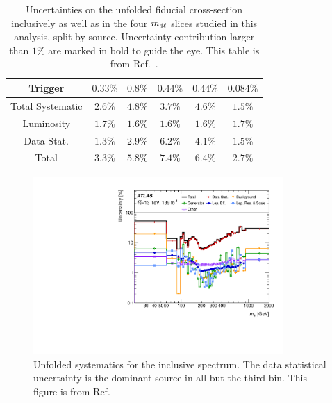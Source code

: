 \begin{table}
\begin{tabular} {c  c  c  c  c  c }
        Trigger &  $ 0.33\% $  &  $ 0.8\% $  &  $ 0.44\% $  &  $ 0.44\% $  &  $ 0.084\% $ \\
        \hline 
        Total Systematic &  $ 2.6\% $  &  $ 4.8\% $  &  $ 3.7\% $  &  $ 4.6\% $  &  $ 1.5\% $ \\
        Luminosity &  $ \mathbf{1.7}\% $  &  $ \mathbf{1.6}\% $  &  $ \mathbf{1.6}\% $  &  $ \mathbf{1.6}\% $  &  $ \mathbf{1.7}\% $ \\
        Data Stat. &  $ \mathbf{1.3}\% $  &  $ \mathbf{2.9}\% $  &  $ \mathbf{6.2}\% $  &  $ \mathbf{4.1}\% $  &  $ \mathbf{1.5}\% $ \\
        \hline 
        Total &  $ 3.3\% $  &  $ 5.8\% $  &  $ 7.4\% $  &  $ 6.4\% $  &  $ 2.7\% $ \\
        \hline 
     \end{tabular}
    \caption{Uncertainties on the unfolded fiducial cross-section inclusively as well as in the four $m_{4\ell}$ slices studied in this analysis, split by source. Uncertainty contribution larger than $1\%$ are marked in bold to guide the eye. This table is from Ref.~\cite{m4l_internalnote}. \label{tab:SysTablePerSlice} }
\end{table}

\begin{figure}
    \centering
    \includegraphics[width=0.85\textwidth]{Figures/m4l/Systematics/UnfoldedSys_M4l_Stack_Paper.pdf}
    \caption{Unfolded systematics for the inclusive \mFourL spectrum. The data statistical uncertainty is the dominant source in all but the third bin. This figure is from Ref.~\cite{m4l2021_paper}}
    \label{fig:m4lsystematics}
\end{figure}